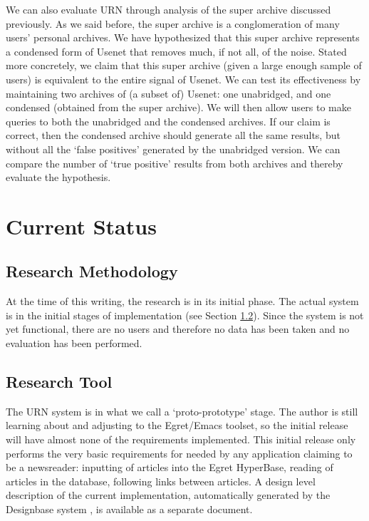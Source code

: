 We can also evaluate URN through analysis of the super archive discussed
previously. As we said before, the super archive is a conglomeration of many
users' personal archives. We have hypothesized that this super archive
represents a condensed form of Usenet that removes much, if not all, of the
noise. Stated more concretely, we claim that this super archive (given a
large enough sample of users) is equivalent to the entire signal of Usenet.
We can test its effectiveness by maintaining two archives of (a subset of)
Usenet: one unabridged, and one condensed (obtained from the super archive).
We will then allow users to make queries to both the unabridged and the
condensed archives. If our claim is correct, then the condensed archive
should generate all the same results, but without all the `false positives'
generated by the unabridged version. We can compare the number of `true
positive' results from both archives and thereby evaluate the hypothesis.

\section{Current Status}

\subsection{Research Methodology}  

At the time of this writing, the research is in its initial phase. The actual
system is in the initial stages of implementation (see Section
\ref{researchtool}). Since the system is not yet functional, there are no
users and therefore no data has been taken and no evaluation has been
performed.

\subsection{Research Tool}
\label{researchtool}

The URN system is in what we call a `proto-prototype' stage. The author is
still learning about and adjusting to the Egret/Emacs toolset, so the
initial release will have almost none of the requirements implemented. This
initial release only performs the very basic requirements for needed by any
application claiming to be a newsreader: inputting of articles into the
Egret HyperBase, reading of articles in the database, following links
between articles. A design level description of the current implementation,
automatically generated by the Designbase system \cite{csdl-93-05}, is
available as a separate document.

